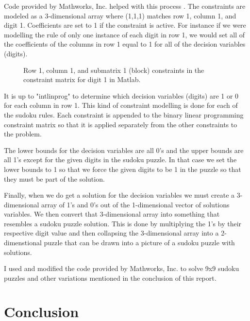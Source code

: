 \documentclass[12pt]{article}
\begin{document}
Code provided by Mathworks, Inc. helped with this process \cite{sudoku2}.  The constraints are modeled as a 3-dimensional array where (1,1,1) matches row 1, column 1, and digit 1.  Coefficients are set to 1 if the constraint is active.  For instance if we were modelling the rule of only one instance of each digit in row 1, we would set all of the coefficients of the columns in row 1 equal to 1 for all of the decision variables (digits).
\begin{figure}[H]
\centering
 \caption{Row 1, column 1, and submatrix 1 (block) constraints in the constraint matrix for digit 1 in Matlab.}
\end{figure}

It is up to "intlinprog" to determine which decision variables (digits) are 1 or 0 for each column in row 1.  This kind of constraint modelling is done for each of the sudoku rules.  Each constraint is appended to the binary linear programming constraint matrix so that it is applied separately from the other constraints to the problem.

The lower bounds for the decision variables are all 0's and the upper bounds are all 1's except for the given digits in the sudoku puzzle.  In that case we set the lower bounds to 1 so that we force the given digits to be 1 in the puzzle so that they must be part of the solution.

Finally, when we do get a solution for the decision variables we must create a 3-dimensional array of 1's and 0's out of the 1-dimensional vector of solutions variables.  We then convert that 3-dimensional array into something that resembles a sudoku puzzle solution.  This is done by multiplying the 1's by their respective digit value and then collapsing the 3-dimensional array into a 2-dimenstional puzzle that can be drawn into a picture of a sudoku puzzle with solutions.

I used and modified the code provided by Mathworks, Inc. to solve 9x9 sudoku puzzles and other variations mentioned in the conclusion of this report.

\section{Conclusion}
\end{document}
